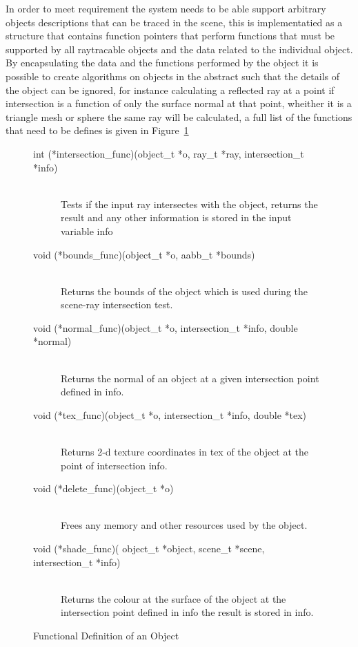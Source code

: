 In order to meet requirement  the system needs to be able support arbitrary objects descriptions
that can be traced in the scene, this is implementatied as a structure that contains function pointers that perform functions
that must be supported by all raytracable objects and the data related to the individual object.
By encapsulating the data and the functions performed by the object it is possible to create algorithms on objects in the
abstract such that the details of the object can be ignored, for instance calculating a reflected ray at a point if intersection
is a function of only the surface normal at that point, wheither it is a triangle mesh or sphere the same ray will be calculated,
a full list of the functions that need to be defines is given in Figure~\ref{fig:object_funcs}

\begin{figure}[h]
\begin{description}
\item[int  (*intersection\_func)(object\_t *o, ray\_t *ray, intersection\_t *info)] \hfill \\
	Tests if the input ray intersectes with the object, returns the result and any other information is stored in the input variable info
\item[void (*bounds\_func)(object\_t *o, aabb\_t *bounds)] \hfill \\
	Returns the bounds of the object which is used during the scene-ray intersection test.
\item[void (*normal\_func)(object\_t *o, intersection\_t *info, double *normal)] \hfill \\
	Returns the normal of an object at a given intersection point defined in info.
\item[void (*tex\_func)(object\_t *o, intersection\_t *info, double *tex)] \hfill \\
	Returns 2-d texture coordinates in tex of the object at the point of intersection info.
\item[void (*delete\_func)(object\_t *o)] \hfill \\
	Frees any memory and other resources used by the object.
\item[void (*shade\_func)( object\_t *object, scene\_t *scene, intersection\_t *info)] \hfill \\
	Returns the colour at the surface of the object at the intersection point defined in info the result is stored in info.
\end{description}
\caption{Functional Definition of an Object}
\label{fig:object_funcs}
\end{figure}


